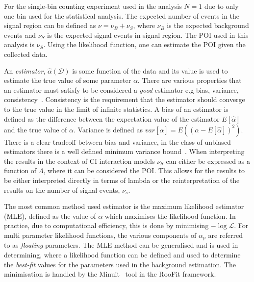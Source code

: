 For the single-bin counting experiment used in the analysis $N = 1$ due to only one bin used for the statistical analysis. The expected number of events in the signal region can be defined as $\nu = \nu_B +\nu_S$, where $\nu_B$ is the expected background events and $\nu_S$ is the expected signal events in signal region. The POI used in this analysis is $\nu_S$. Using the likelihood function, one can estimate the POI given the collected data. 

An \emph{estimator}, $\hat{\alpha}(\mathcal{D})$ is some function of the data and its value is used to estimate the true value of some parameter $\alpha$. There are various properties that an estimator must satisfy to be considered a \emph{good} estimator e.g bias, variance, consistency~\cite{errorsOnNumbers}. Consistency is the requirement that the estimator should converge to the true value in the limit of infinite statistics. A bias of an estimator is defined as the difference between the expectation value of the estimator $E[\hat{\alpha}]$ and the true value of $\alpha$. Variance is defined as $var[\hat{\alpha}] = E\left((\alpha - E[\hat{\alpha}])^{2}\right)$. There is a clear tradeoff between bias and variance, in the class of unbiased estimators there is a well defined minimum variance bound~\cite{Cranmer:2015nia}. When interpreting the results in the context of CI interaction models $\nu_S$ can either be expressed as a function of $\Lambda$, where it can be considered the POI. This allows for the results to be either interpreted directly in terms of lambda or the reinterpretation of the results on the number of signal events, $\nu_s$.

The most common method used estimator is the maximum likelihood estimator (MLE), defined as the value of $\alpha$ which maximises the likelihood function. In practice, due to computational efficiency, this is done by minimising $-\log\mathcal{L}$. For multi parameter likelihood functions, the various components of $\alpha_p$ are referred to as \emph{floating} parameters. The MLE method can be generalised and is used in determining, where a likelihood function can be defined and used to determine the \emph{best-fit} values for the parameters used in the background estimation. The minimisation is handled by the Minuit~\cite{James:873119} tool in the RooFit framework.

